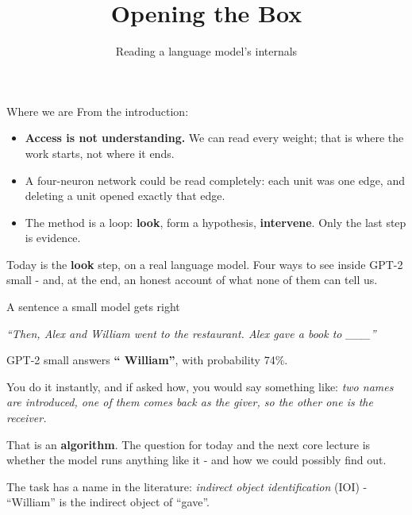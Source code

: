 \documentclass[aspectratio=169]{beamer}
\title{Opening the Box}
\subtitle{Reading a language model's internals}
\author{}
\date{}
\newcommand{\keybox}[1]{%
  \begin{tcolorbox}[colback=armblue!8, colframe=armblue, boxrule=0.6pt, arc=2pt]
  #1
  \end{tcolorbox}}
\newcommand{\promptbox}[1]{%
  \begin{center}
  \begin{tcolorbox}[colback=lightbg, colframe=gray, boxrule=0.5pt, arc=2pt, width=0.88\textwidth]
    \centering\textit{#1}
  \end{tcolorbox}
  \end{center}}
\begin{document}
\begin{frame}[plain]
  \titlepage
\end{frame}

\begin{frame}{Where we are}
  \vspace{0.5em}
  From the introduction:

  \vspace{0.5em}
  \begin{itemize}
    \item \textbf{Access is not understanding.} We can read every weight; that is where the work
      starts, not where it ends.
    \item A four-neuron network could be read completely: each unit was one edge, and deleting a
      unit opened exactly that edge.
    \item The method is a loop: \textbf{look}, form a hypothesis, \textbf{intervene}. Only the last
      step is evidence.
  \end{itemize}

  \vspace{0.8em}
  \keybox{Today is the \textbf{look} step, on a real language model. Four ways to see inside
  GPT-2 small - and, at the end, an honest account of what none of them can tell us.}
\end{frame}

\begin{frame}{A sentence a small model gets right}
  \promptbox{``Then, Alex and William went to the restaurant. Alex gave a book to \_\_\_''}

  \vspace{0.3em}
  GPT-2 small answers \textbf{`` William''}, with probability 74\%.

  \vspace{0.9em}
  You do it instantly, and if asked how, you would say something like: \emph{two names are
  introduced, one of them comes back as the giver, so the other one is the receiver.}

  \vspace{0.9em}
  \keybox{That is an \textbf{algorithm}. The question for today and the next core lecture is whether
  the model runs anything like it - and how we could possibly find out.}

  \vspace{0.4em}
  {\footnotesize The task has a name in the literature: \emph{indirect object identification}
  (IOI) - ``William'' is the indirect object of ``gave''.}
\end{frame}
\end{document}
